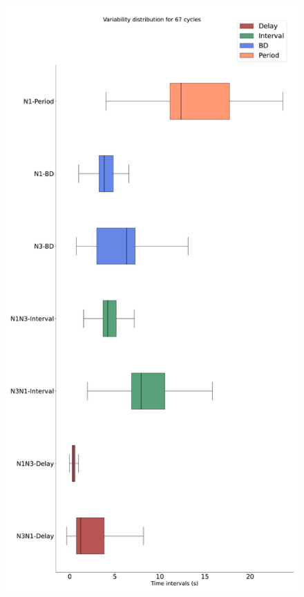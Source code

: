 \begin{figure}[htbp]
\begin{minipage}[b]{0.45\textwidth}
		\includegraphics[width=\textwidth]{./invariants/data/SUSSEX/prep3/images/prep3_boxplot.pdf}
	\end{minipage}
	\begin{minipage}[b]{0.53\textwidth}
		\centering

\end{minipage}
\end{figure}
